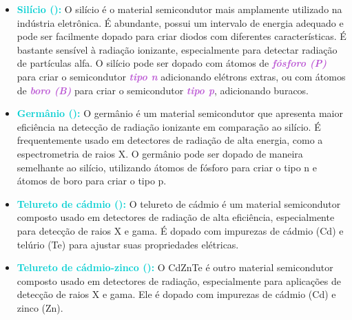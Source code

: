 \documentclass[11pt,a4paper]{article}
\begin{document}
	\begin{tcolorbox}[width=\textwidth, colback={white}, colbacktitle={DarkTurquoise!50!white}, title={$\bigstar$ \LobsterTwo{Principais Materiais: Diodos} $\bigstar$}, coltitle={CarnationPink}, colframe={DarkTurquoise}, fonttitle=\rmfamily\bfseries\Large, breakable]
	\begin{itemize}[label=\textcolor{CarnationPink}{$\star$}]
		\item \textcolor{DarkTurquoise}{\textbf{Silício ():}} O silício é o material semicondutor mais amplamente utilizado na indústria eletrônica. É abundante, possui um intervalo de energia adequado e pode ser facilmente dopado para criar diodos com diferentes características. É bastante sensível à radiação ionizante, especialmente para detectar radiação de partículas alfa. O silício pode ser dopado com átomos de \textcolor{MediumOrchid}{\textit{\textbf{fósforo (P)}}} para criar o semicondutor \textcolor{MediumOrchid}{\textit{\textbf{tipo n}}} adicionando elétrons extras, ou com átomos de \textcolor{MediumOrchid}{\textit{\textbf{boro (B)}}} para criar o semicondutor \textcolor{MediumOrchid}{\textit{\textbf{tipo p}}}, adicionando buracos.
				
		\item \textcolor{DarkTurquoise}{\textbf{Germânio ():}} O germânio é um material semicondutor que apresenta maior eficiência na detecção de radiação ionizante em comparação ao silício. É frequentemente usado em detectores de radiação de alta energia, como a espectrometria de raios X.  O germânio pode ser dopado de maneira semelhante ao silício, utilizando átomos de fósforo para criar o tipo n e átomos de boro para criar o tipo p.
				
		\item \textcolor{DarkTurquoise}{\textbf{Telureto de cádmio ():}} O telureto de cádmio é um material semicondutor composto usado em detectores de radiação de alta eficiência, especialmente para detecção de raios X e gama. É dopado com impurezas de cádmio (Cd) e telúrio (Te) para ajustar suas propriedades elétricas.

		\item \textcolor{DarkTurquoise}{\textbf{Telureto de cádmio-zinco ():}} O CdZnTe é outro material semicondutor composto usado em detectores de radiação, especialmente para aplicações de detecção de raios X e gama. Ele é dopado com impurezas de cádmio (Cd) e zinco (Zn).
	\end{itemize}
	\end{tcolorbox}
\end{document}

